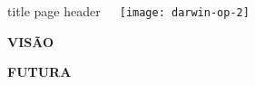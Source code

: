 \begin{frame}
    \begin{columns}
        ~\hfill
            \begin{beamercolorbox}[sep=8em, colsep*=18pt, wd=\textwidth,ht=\paperheight]{title page header}
                \begin{center}
                    \textbf{\huge{VISÃO}}\par
                    \vspace*{0.3cm}
                    \textbf{\huge{FUTURA}}
                \end{center}
            \end{beamercolorbox}%
            
        \begin{center}
            \texttt{[image: darwin-op-2]}
        \end{center}
            
    \end{columns}
  
 \end{frame}
